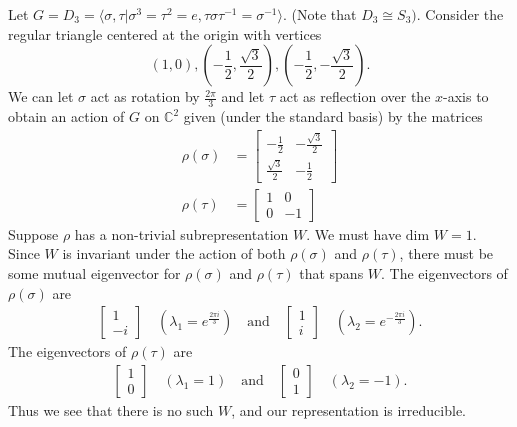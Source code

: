 \begin{example} \label{2d-irrep-d3}
Let $G = D_3 = \langle \sigma, \tau | \sigma^3 = \tau^2 = e, \tau \sigma \tau^{-1} = \sigma^{-1} \rangle$. (Note that $D_3 \cong S_3)$.
Consider the regular triangle centered at the origin with vertices
\[(1,0), (-\frac{1}{2}, \frac{\sqrt{3}}{2}), (-\frac{1}{2}, - \frac{\sqrt{3}}{2}). \]
We can let $\sigma$ act as rotation by $\frac{2 \pi}{3}$ and let $\tau$ act as reflection over the $x$-axis to obtain an action of $G$ on $\mathbb{C}^2$ given (under the standard basis) by the matrices
\begin{align*}
\rho(\sigma) &= \begin{bmatrix}-\frac{1}{2} & -\frac{\sqrt{3}}{2} \\ \frac{\sqrt{3}}{2} & -\frac{1}{2}\end{bmatrix} \\
\rho(\tau) &= \begin{bmatrix}1 & 0 \\ 0 & -1 \end{bmatrix}
\end{align*}
Suppose $\rho$ has a non-trivial subrepresentation $W$.  We must have $\text{dim }W =1$.  Since $W$ is invariant under the action of both $\rho(\sigma)$ and $\rho(\tau)$, there must be some mutual eigenvector for $\rho(\sigma)$ and $\rho(\tau)$ that spans $W$.  The eigenvectors of $\rho(\sigma)$ are
\begin{align*}
\begin{bmatrix} 1 \\ -i \end{bmatrix} \quad (\lambda_1 = e^{\frac{2 \pi i}{3}}) \quad \text{and} \quad
\begin{bmatrix} 1 \\ i \end{bmatrix} \quad (\lambda_2 = e^{-\frac{2 \pi i}{3}}) .
\end{align*}  
The eigenvectors of $\rho(\tau)$ are 
\begin{align*}
\begin{bmatrix} 1 \\ 0 \end{bmatrix} \quad (\lambda_1 = 1) \quad \text{and} \quad
\begin{bmatrix} 0 \\ 1 \end{bmatrix} \quad (\lambda_2 = -1).
\end{align*}
Thus we see that there is no such $W$, and our representation is irreducible.

\end{example}
